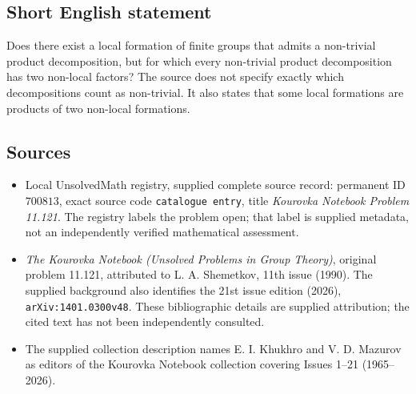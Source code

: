 \documentclass[11pt]{article}
\begin{document}
\subsection{Short English statement}
Does there exist a local formation of finite groups that admits a non-trivial product decomposition, but for which every non-trivial product decomposition has two non-local factors? The source does not specify exactly which decompositions count as non-trivial. It also states that some local formations are products of two non-local formations.
\subsection{Sources}
\begin{itemize}
\item Local UnsolvedMath registry, supplied complete source record: permanent ID \(700813\), exact source code \texttt{catalogue entry}, title \emph{Kourovka Notebook Problem 11.121}. The registry labels the problem open; that label is supplied metadata, not an independently verified mathematical assessment.
\item \emph{The Kourovka Notebook (Unsolved Problems in Group Theory)}, original problem 11.121, attributed to L. A. Shemetkov, 11th issue (1990). The supplied background also identifies the 21st issue edition (2026), \texttt{arXiv:1401.0300v48}. These bibliographic details are supplied attribution; the cited text has not been independently consulted.
\item The supplied collection description names E. I. Khukhro and V. D. Mazurov as editors of the Kourovka Notebook collection covering Issues 1--21 (1965--2026).
\end{itemize}
\end{document}
